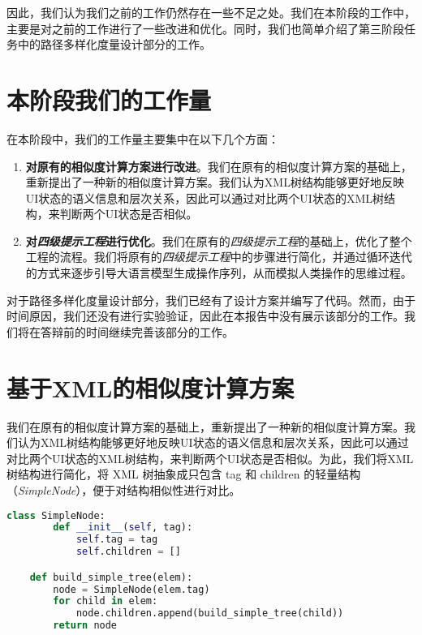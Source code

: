\documentclass{article}
\begin{document}
因此，我们认为我们之前的工作仍然存在一些不足之处。我们在本阶段的工作中，主要是对之前的工作进行了一些改进和优化。同时，我们也简单介绍了第三阶段任务中的路径多样化度量设计部分的工作。

\section{本阶段我们的工作量}

在本阶段中，我们的工作量主要集中在以下几个方面：

\begin{enumerate}
    \item \textbf{对原有的相似度计算方案进行改进}。我们在原有的相似度计算方案的基础上，重新提出了一种新的相似度计算方案。我们认为XML树结构能够更好地反映UI状态的语义信息和层次关系，因此可以通过对比两个UI状态的XML树结构，来判断两个UI状态是否相似。
    \item \textbf{对\textit{四级提示工程}进行优化}。我们在原有的\textit{四级提示工程}的基础上，优化了整个工程的流程。我们将原有的\textit{四级提示工程}中的步骤进行简化，并通过循环迭代的方式来逐步引导大语言模型生成操作序列，从而模拟人类操作的思维过程。
\end{enumerate}

对于路径多样化度量设计部分，我们已经有了设计方案并编写了代码。然而，由于时间原因，我们还没有进行实验验证，因此在本报告中没有展示该部分的工作。我们将在答辩前的时间继续完善该部分的工作。

\section{基于XML的相似度计算方案}

我们在原有的相似度计算方案的基础上，重新提出了一种新的相似度计算方案。我们认为XML树结构能够更好地反映UI状态的语义信息和层次关系，因此可以通过对比两个UI状态的XML树结构，来判断两个UI状态是否相似。为此，我们将XML树结构进行简化，将 XML 树抽象成只包含 tag 和 children 的轻量结构（\textit{SimpleNode}），便于对结构相似性进行对比。

\begin{lstlisting}[language=python, caption=构建XML树结构]
    class SimpleNode:
        def __init__(self, tag):
            self.tag = tag
            self.children = []

    def build_simple_tree(elem):
        node = SimpleNode(elem.tag)
        for child in elem:
            node.children.append(build_simple_tree(child))
        return node
\end{lstlisting}
\end{document}
